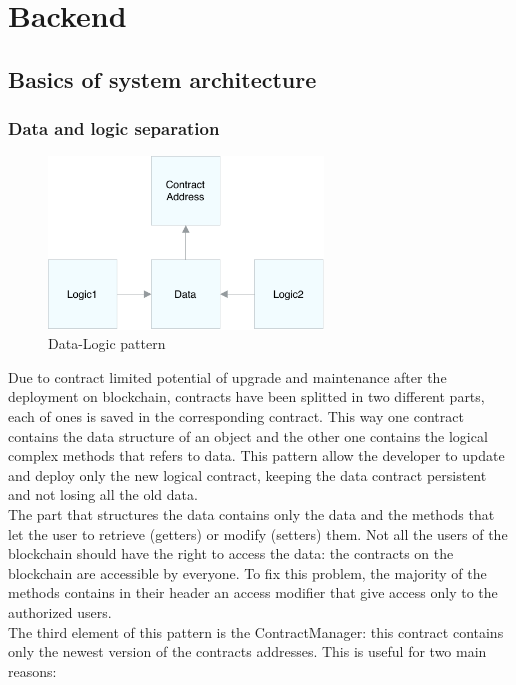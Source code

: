 \section{Backend}

\subsection{Basics of system architecture}
\subsubsection{Data and logic separation}\label{DataLogic}
\begin{figure}[!h]
	\centering
	\includegraphics[width=0.65\textwidth]{img/DataLogic.pdf}
	\caption{Data-Logic pattern}
\end{figure}
Due to contract limited potential of upgrade and maintenance after the deployment on blockchain, contracts have been splitted in two different parts, each of ones is saved in the corresponding contract. This way one contract contains the data structure of an object and the other one contains the logical complex methods that refers to data.
This pattern allow the developer to update and deploy only the new logical contract, keeping the data contract persistent and not losing all the old data. \\
The part that structures the data contains only the data and the methods that let the user to retrieve (getters) or modify (setters) them. Not all the users of the blockchain should have the right to access the data: the contracts on the blockchain are accessible by everyone. To fix this problem, the majority of the methods contains in their header an access modifier that give access only to the authorized users. \\
The third element of this pattern is the ContractManager: this contract contains only the newest version of the contracts addresses. This is useful for two main reasons:
